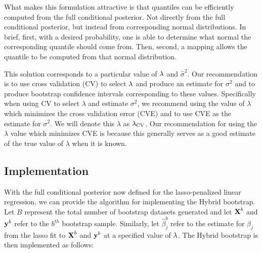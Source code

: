 

What makes this formulation attractive is that quantiles can be efficiently computed from the full conditional posterior. Not directly from the full conditional posterior, but instead from corresponding normal distributions. In brief, first, with a desired probability, one is able to determine what normal the corresponding quantile should come from. Then, second, a mapping allows the quantile to be computed from that normal distribution.

This solution corresponds to a particular value of $\lambda$ and $\hat{\sigma}^2$. Our recommendation is to use cross validation (CV) to select $\lambda$ and produce an estimate for $\sigma^2$ and to produce bootstrap confidence intervals corresponding to these values. Specifically when using CV to select $\lambda$ and estimate $\sigma^2$, we recommend using the value of $\lambda$ which minimizes the cross validation error (CVE) and to use CVE as the estimate for $\sigma^2$. We will denote this $\lambda$ as $\lambda_{\textrm{CV}}$. Our recommendation for using the $\lambda$ value which minimizes CVE is because this generally serves as a good estimate of the true value of $\lambda$ when it is known.

\subsection{Implementation}
\label{Sec:implementation}

With the full conditional posterior now defined for the lasso-penalized linear regression, we can provide the algorithm for implementing the Hybrid bootstrap. Let $B$ represent the total number of bootstrap datasets generated and let $\boldsymbol{\mathbf{X}}^b$ and $\boldsymbol{\mathbf{y}}^{b}$ refer to the $b^{th}$ bootstrap sample. Similarly, let $\hat{\beta}^b_j$ refer to the estimate for $\beta_j$ from the lasso fit to $\boldsymbol{\mathbf{X}}^b$ and $\boldsymbol{\mathbf{y}}^b$ at a specified value of $\lambda$. The Hybrid bootstrap is then implemented as follows:


